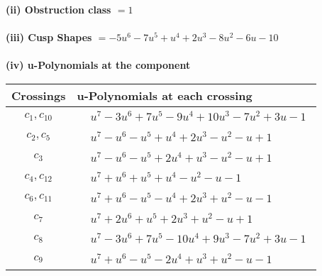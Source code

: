 \documentclass[1p]{elsarticle_modified}
\theoremstyle{definition}
\begin{document}
\flushleft \textbf{(ii) Obstruction class $= 1$}\\~\\
\flushleft \textbf{(iii) Cusp Shapes $= -5 u^6-7 u^5+u^4+2 u^3-8 u^2-6 u-10$}\\~\\
\newpage\renewcommand{\arraystretch}{1}
\flushleft \textbf{(iv) u-Polynomials at the component}\newline \\
\begin{tabular}{m{50pt}|m{274pt}}
Crossings & \hspace{64pt}u-Polynomials at each crossing \\
\hline $$\begin{aligned}c_{1},c_{10}\end{aligned}$$&$\begin{aligned}
&u^7-3 u^6+7 u^5-9 u^4+10 u^3-7 u^2+3 u-1
\end{aligned}$\\
\hline $$\begin{aligned}c_{2},c_{5}\end{aligned}$$&$\begin{aligned}
&u^7- u^6- u^5+u^4+2 u^3- u^2- u+1
\end{aligned}$\\
\hline $$\begin{aligned}c_{3}\end{aligned}$$&$\begin{aligned}
&u^7- u^6- u^5+2 u^4+u^3- u^2- u+1
\end{aligned}$\\
\hline $$\begin{aligned}c_{4},c_{12}\end{aligned}$$&$\begin{aligned}
&u^7+u^6+u^5+u^4- u^2- u-1
\end{aligned}$\\
\hline $$\begin{aligned}c_{6},c_{11}\end{aligned}$$&$\begin{aligned}
&u^7+u^6- u^5- u^4+2 u^3+u^2- u-1
\end{aligned}$\\
\hline $$\begin{aligned}c_{7}\end{aligned}$$&$\begin{aligned}
&u^7+2 u^6+u^5+2 u^3+u^2- u+1
\end{aligned}$\\
\hline $$\begin{aligned}c_{8}\end{aligned}$$&$\begin{aligned}
&u^7-3 u^6+7 u^5-10 u^4+9 u^3-7 u^2+3 u-1
\end{aligned}$\\
\hline $$\begin{aligned}c_{9}\end{aligned}$$&$\begin{aligned}
&u^7+u^6- u^5-2 u^4+u^3+u^2- u-1
\end{aligned}$\\
\hline
\end{tabular}\\~\\
\end{document}
